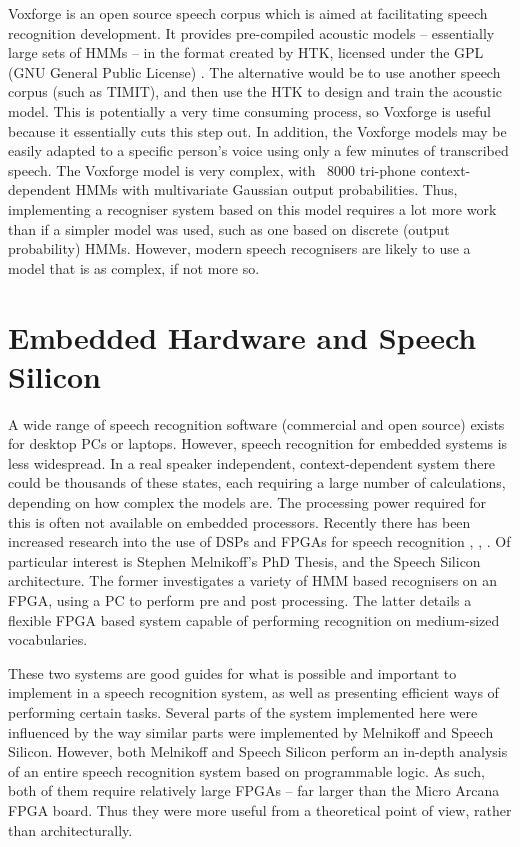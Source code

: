 	Voxforge is an open source speech corpus which is aimed at facilitating speech recognition development.  It provides pre-compiled acoustic models -- essentially large sets of HMMs -- in the format created by HTK, licensed under the GPL (GNU General Public License) \cite{voxforge}.  The alternative would be to use another speech corpus (such as TIMIT), and then use the HTK to design and train the acoustic model.  This is potentially a very time consuming process, so Voxforge is useful because it essentially cuts this step out.  In addition, the Voxforge models may be easily adapted to a specific person's voice using only a few minutes of transcribed speech.  The Voxforge model is very complex, with ~8000 tri-phone context-dependent HMMs with multivariate Gaussian output probabilities.  Thus, implementing a recogniser system based on this model requires a lot more work than if a simpler model was used, such as one based on discrete (output probability) HMMs.  However, modern speech recognisers are likely to use a model that is as complex, if not more so.


\section{Embedded Hardware and Speech Silicon} %
\label{sec:embedded_hardware}
	A wide range of speech recognition software (commercial and open source) exists for desktop PCs or laptops.  However, speech recognition for embedded systems is less widespread.  In a real speaker independent, context-dependent system there could be thousands of these states, each requiring a large number of calculations, depending on how complex the models are.  The processing power required for this is often not available on embedded processors.  Recently there has been increased research into the use of DSPs and FPGAs for speech recognition \cite{melnikoff2003speech}, \cite{schuster2006speech}, \cite{nedevschi2005hardware}.  Of particular interest is Stephen Melnikoff's PhD Thesis, and the Speech Silicon architecture.  The former investigates a variety of HMM based recognisers on an FPGA, using a PC to perform pre and post processing.  The latter details a flexible FPGA based system capable of performing recognition on medium-sized vocabularies.

	These two systems are good guides for what is possible and important to implement in a speech recognition system, as well as presenting efficient ways of performing certain tasks.  Several parts of the system implemented here were influenced by the way similar parts were implemented by Melnikoff and Speech Silicon.  However, both Melnikoff and Speech Silicon perform an in-depth analysis of an entire speech recognition system based on programmable logic.  As such, both of them require relatively large FPGAs -- far larger than the Micro Arcana FPGA board.  Thus they were more useful from a theoretical point of view, rather than architecturally.


